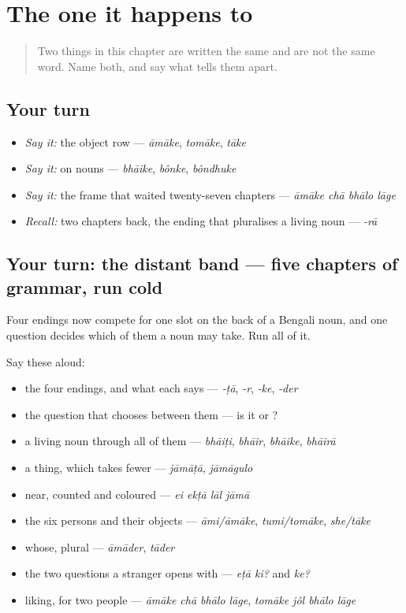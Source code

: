 \section[\texorpdfstring{\bn{কে} · \bn{আমাকে} … (-ke · āmāke …)}{কে · আমাকে … (-ke · āmāke …)}]{The one it happens to}

\label{lesson:BN-R25-the-one-it-happens-to}



\begin{quote}
Two things in this chapter are written the same and are not the same word. Name both, and say what tells them apart.
\end{quote}

\subsection*{Your turn}
\begin{itemize}
\raggedright
  \item \emph{Say it:} the object row — \emph{āmāke}, \emph{tomāke}, \emph{tāke}
  \item \emph{Say it:} on nouns — \emph{bhāike}, \emph{bônke}, \emph{bôndhuke}
  \item \emph{Say it:} the frame that waited twenty-seven chapters — \emph{āmāke chā bhālo lāge}
  \item \emph{Recall:} two chapters back, the ending that pluralises a living noun — \emph{-rā}
\end{itemize}

\subsection*{Your turn: the distant band — five chapters of grammar, run cold}
Four endings now compete for one slot on the back of a Bengali noun, and one question decides which of them a noun may take. Run all of it.

Say these aloud:

\begin{itemize}
\raggedright
  \item the four endings, and what each says — \emph{-ṭā}, \emph{-r}, \emph{-ke}, \emph{-der}
  \item the question that chooses between them — is it \textbf{} or \textbf{}?
  \item a living noun through all of them — \emph{bhāiṭi}, \emph{bhāir}, \emph{bhāike}, \emph{bhāirā}
  \item a thing, which takes fewer — \emph{jāmāṭā}, \emph{jāmāgulo}
  \item near, counted and coloured — \emph{ei ekṭā lāl jāmā}
  \item the six persons and their objects — \emph{āmi/āmāke}, \emph{tumi/tomāke}, \emph{she/tāke}
  \item whose, plural — \emph{āmāder}, \emph{tāder}
  \item the two questions a stranger opens with — \emph{eṭā ki?} and \emph{ke?}
  \item liking, for two people — \emph{āmāke chā bhālo lāge}, \emph{tomāke jôl bhālo lāge}
\end{itemize}

